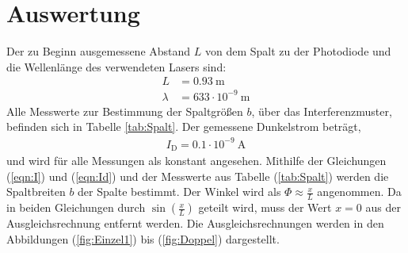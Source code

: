 \section{Auswertung}
\label{sec:Auswertung}

Der zu Beginn ausgemessene Abstand $L$ von dem Spalt zu der Photodiode und die Wellenlänge des verwendeten Lasers sind:
\begin{align*}
  L &= 0.93 \ \text{m} \\
  \lambda &= 633 \cdot 10^{-9} \ \text{m}
\end{align*}
Alle Messwerte zur Bestimmung der Spaltgrößen $b$, über das Interferenzmuster, befinden sich in Tabelle \ref{tab:Spalt}. Der gemessene Dunkelstrom beträgt,
\begin{align*}
  I_\text{D} = 0.1 \cdot 10^{-9} \ \text{A}
\end{align*}
und wird für alle Messungen als konstant angesehen. Mithilfe der Gleichungen (\ref{eqn:I}) und (\ref{eqn:Id}) und der Messwerte aus Tabelle (\ref{tab:Spalt}) werden die Spaltbreiten $b$ der Spalte bestimmt. Der Winkel wird als $\Phi \approx \frac{x}{L}$ angenommen. Da in beiden Gleichungen durch $\sin\left(\frac{x}{L} \right)$ geteilt wird, muss der Wert $x = 0$ aus der Ausgleichsrechnung entfernt werden. Die Ausgleichsrechnungen werden in den Abbildungen (\ref{fig:Einzel1}) bis (\ref{fig:Doppel}) dargestellt.

